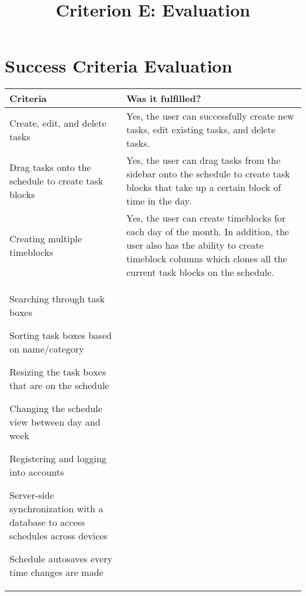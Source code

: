\documentclass[12pt]{report}
\title{Criterion E: Evaluation}
\begin{document}
\centerline{\textcolor{msblue}{
		\textbf{\fontsize{13}{13}\MyTitle}
	}}


\section*{Success Criteria Evaluation}

\begin{tabularx}{\linewidth}{|X|X|}
	Criteria
	 & Was it fulfilled?
	\\\hline
	Create, edit, and delete tasks
	&
	Yes, the user can successfully create new tasks, edit existing tasks, and delete tasks.
	\\\hline
	Drag tasks onto the schedule to create task blocks
	&
	Yes, the user can drag tasks from the sidebar onto the schedule to create task blocks that take up a certain block of time in the day.
	\\\hline
	Creating multiple timeblocks
	&
	Yes, the user can create timeblocks for each day of the month. In addition, the user also has the ability to create timeblock columns which clones all the current task blocks on the schedule.
	\\\hline
	\item Searching through task boxes
	\item Sorting task boxes based on name/category
	\item Resizing the task boxes that are on the schedule
	\item Changing the schedule view between day and week
	\item Registering and logging into accounts
	\item Server-side synchronization with a database to access schedules across devices
	\item Schedule autosaves every time changes are made
\end{tabularx}
\end{document}
